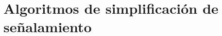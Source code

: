 \section{Algoritmos de simplificación de señalamiento}
    \label{sec:simplificacion}
    
\lipsum[1-5]




